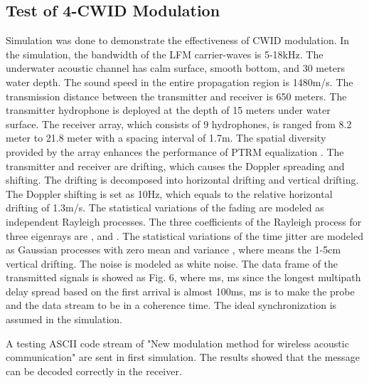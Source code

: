 \documentclass[journal]{IEEEtran}
\begin{document}
\subsection{Test of 4-CWID Modulation}
Simulation was done to demonstrate the effectiveness of CWID
modulation. In the simulation, the bandwidth of the LFM
carrier-waves is 5-18kHz. The underwater acoustic channel has calm
surface, smooth bottom, and 30 meters water depth. The sound speed
in the entire propagation region is 1480m/s. The transmission
distance between the transmitter and receiver is 650 meters. The
transmitter hydrophone is deployed at the depth of 15 meters under
water surface. The receiver array, which consists of 9 hydrophones,
is ranged from 8.2 meter to 21.8 meter with a spacing interval of
1.7m. The spatial diversity provided by the array enhances the
performance of PTRM equalization \cite{Rouseff2001}. The transmitter
and receiver are drifting, which causes the Doppler spreading and
shifting. The drifting is decomposed into horizontal drifting and
vertical drifting. The Doppler shifting is set as 10Hz, which equals
to the relative horizontal drifting of 1.3m/s. The statistical
variations of the fading are modeled as independent Rayleigh
processes. The three coefficients of the Rayleigh process for three
eigenrays are ,  and
. The statistical variations of the time jitter are
modeled as Gaussian processes with zero mean and variance
, where  means the 1-5cm vertical
drifting. The noise is modeled as white noise. The data frame of the
transmitted signals is showed as Fig. 6, where ms,
ms since the longest multipath delay spread based
on the first arrival is almost 100ms, ms is to make the
probe and the data stream to be in a coherence time. The ideal
synchronization is assumed in the simulation.

A testing ASCII code stream of "New modulation method for wireless
acoustic communication" are sent in first simulation. The results
showed that the message can be decoded correctly in the receiver.
\end{document}
